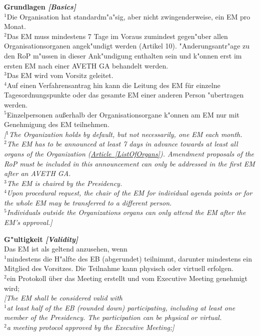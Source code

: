 \documentclass[10pt]{article}
\newcounter{qcounter}
\begin{document}
\begin{list}{{\bf Artikel :~}}{}
\item {\bf Grundlagen {\it[Basics]}}\\
$^{1}$Die Organisation hat standardm"a"sig, aber nicht zwingenderweise, ein EM pro Monat.\\
$^{2}$Das EM muss mindestens 7 Tage im Voraus zumindest gegen"uber allen Organisationsorganen angek"undigt werden (Artikel 10). "Anderungsantr"age zu den RoP m"ussen in dieser Ank"undigung enthalten sein und k"onnen erst im ersten EM nach einer AVETH GA behandelt werden.\\
$^{3}$Das EM wird vom Vorsitz geleitet.\\
$^{4}$Auf einen Verfahrensantrag hin kann die Leitung des EM für einzelne Tagesordnungspunkte oder das gesamte EM einer anderen Person "ubertragen werden.\\
$^{5}$Einzelpersonen außerhalb der Organisationsorgane k"onnen am EM nur mit Genehmigung des EM teilnehmen.\\
{\it[$^{1}$The Organization holds by default, but not necessarily, one EM each month.\\
$^{2}$The EM has to be announced at least 7 days in advance towards at least all organs of the Organization (\hyperref[ListOfOrgans]{Article~\ref{ListOfOrgans}}). Amendment proposals of the RoP must be included in this announcement can only be addressed in the first EM after an AVETH GA.\\
$^{3}$The EM is chaired by the Presidency.\\
$^{4}$Upon procedural request, the chair of the EM for individual agenda points or for the whole EM may be transferred to a different person.\\
$^{5}$Individuals outside the Organizations organs can only attend the EM after the EM's approval.]}

\item {\bf G"ultigkeit {\it[Validity]}}\\
Das EM ist als geltend anzusehen, wenn\\
$^{1}$mindestens die H"alfte des EB (abgerundet) teilnimmt, darunter mindestens ein Mitglied des Vorsitzes. Die Teilnahme kann physisch oder virtuell erfolgen.\\
$^{2}$ein Protokoll über das Meeting erstellt und vom Executive Meeting genehmigt wird;\\
{\it [The EM shall be considered valid with\\
$^{1}$at least half of the EB (rounded down) participating, including at least one member of the Presidency. The participation can be physical or virtual. \\
$^{2}$a meeting protocol approved by the Executive Meeting;]}


\end{list}
\end{document}
